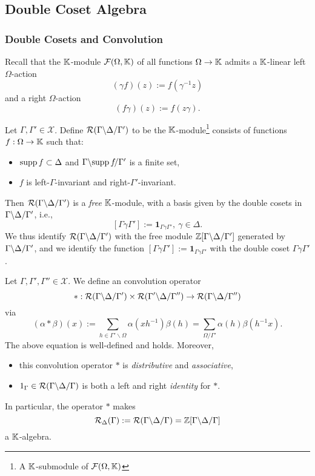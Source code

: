 \subsection{Double Coset Algebra}

\subsubsection{Double Cosets and Convolution}
Recall that the $\mathbb{K}$-module $\mathcal{F}(\Omega, \mathbb{K})$ of all functions $\Omega\to\mathbb{K}$ admits a $\mathbb{K}$-linear left $\Omega$-action\[(\gamma f)(z) := f(\gamma^{-1}z)\]
and a right $\Omega$-action \[(f\gamma)(z) := f(z\gamma).\]
\begin{defthm}
    Let $\Gamma, \Gamma'\in\mathscr{X}$. Define $\mathcal{R}({\Gamma}\backslash {\Delta}\slash {\Gamma'})$
    to be the $\mathbb{K}$-module\footnote{A $\mathbb{K}$-submodule of $\mathcal{F}(\Omega, \mathbb{K})$} consists of functions $f : \Omega\to\mathbb{K}$ such that:
    \begin{itemize}
        \item $\operatorname{supp} f\subset\Delta$ and ${\Gamma}\backslash {\operatorname{supp}f\!}\slash {\Gamma'}$ is a finite set,
        \item $f$ is left-$\Gamma$-invariant and right-$\Gamma'$-invariant.
    \end{itemize}
    Then $\mathcal{R}({\Gamma}\backslash {\Delta}\slash {\Gamma'})$ is a \textit{free} $\mathbb{K}$-module,
    with a basis given by the double cosets in ${\Gamma}\backslash {\Delta}\slash {\Gamma'}$, i.e., \[[\Gamma\gamma\Gamma'] := \boldsymbol{1}_{\Gamma\gamma\Gamma'},\ \gamma\in\Delta.\]
    We thus identify $\mathcal{R}({\Gamma}\backslash {\Delta}\slash {\Gamma'})$ with the free module $\mathbb{Z}[{\Gamma}\backslash {\Delta}\slash {\Gamma'}]$ generated by ${\Gamma}\backslash {\Delta}\slash {\Gamma'}$, and we identify the function $[\Gamma\gamma\Gamma'] := \boldsymbol{1}_{\Gamma\gamma\Gamma'}$ with the double coset $\Gamma\gamma\Gamma'$.
\end{defthm}

\begin{defthm}[Convolution]
    Let $\Gamma, \Gamma', \Gamma''\in\mathscr{X}$.
    We define an convolution operator \[* : \mathcal{R}({\Gamma}\backslash {\Delta}\slash {\Gamma'})\times\mathcal{R}({\Gamma'}\backslash {\Delta}\slash {\Gamma''})\to \mathcal{R}({\Gamma}\backslash {\Delta}\slash {\Gamma''})\]
    via \[(\alpha *\beta)(x) := \sum_{h\in\Gamma'\backslash\Omega} \alpha(xh^{-1})\beta(h) = \sum_{\Omega/\Gamma'}\alpha(h)\beta(h^{-1}x).\]
    The above equation is well-defined and holds.
    Moreover,\begin{itemize}
        \item this convolution operator $*$ is \textit{distributive} and \textit{associative},
        \item $1_{\Gamma}\in\mathcal{R}({\Gamma}\backslash {\Delta}\slash {\Gamma})$ is both a left and right \textit{identity} for $*$.
    \end{itemize}
    In particular, the operator $*$ makes \[\mathcal{R}_\Delta(\Gamma) := \mathcal{R}({\Gamma}\backslash {\Delta}\slash {\Gamma}) = \mathbb{Z}[{\Gamma}\backslash {\Delta}\slash {\Gamma}]\] a $\mathbb{K}$-algebra.
\end{defthm}


